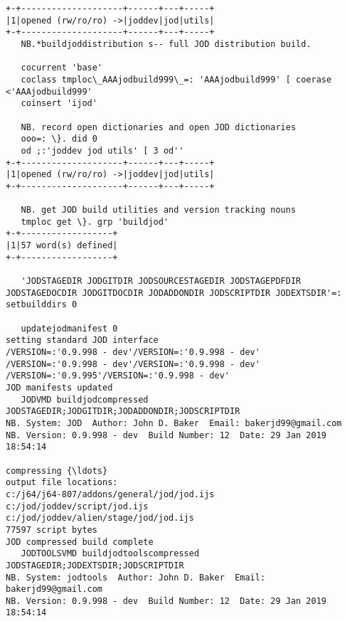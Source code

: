 \documentclass[11pt,letter,landscape]{article}
\begin{document}
    \begin{Verbatim}[commandchars=\\\{\}]
+-+--------------------+------+---+-----+
|1|opened (rw/ro/ro) ->|joddev|jod|utils|
+-+--------------------+------+---+-----+
   NB.*buildjoddistribution s-- full JOD distribution build.
   
   cocurrent 'base'
   coclass tmploc\_AAAjodbuild999\_=: 'AAAjodbuild999' [ coerase <'AAAjodbuild999'
   coinsert 'ijod'
   
   NB. record open dictionaries and open JOD dictionaries
   ooo=: \}. did 0
   od ;:'joddev jod utils' [ 3 od''
+-+--------------------+------+---+-----+
|1|opened (rw/ro/ro) ->|joddev|jod|utils|
+-+--------------------+------+---+-----+
   
   NB. get JOD build utilities and version tracking nouns
   tmploc get \}. grp 'buildjod'
+-+------------------+
|1|57 word(s) defined|
+-+------------------+
   
   'JODSTAGEDIR JODGITDIR JODSOURCESTAGEDIR JODSTAGEPDFDIR JODSTAGEDOCDIR JODGITDOCDIR JODADDONDIR JODSCRIPTDIR JODEXTSDIR'=: setbuilddirs 0
   
   updatejodmanifest 0
setting standard JOD interface
/VERSION=:'0.9.998 - dev'/VERSION=:'0.9.998 - dev'
/VERSION=:'0.9.998 - dev'/VERSION=:'0.9.998 - dev'
/VERSION=:'0.9.995'/VERSION=:'0.9.998 - dev'
JOD manifests updated
   JODVMD buildjodcompressed JODSTAGEDIR;JODGITDIR;JODADDONDIR;JODSCRIPTDIR
NB. System: JOD  Author: John D. Baker  Email: bakerjd99@gmail.com
NB. Version: 0.9.998 - dev  Build Number: 12  Date: 29 Jan 2019 18:54:14

compressing {\ldots} 
output file locations:
c:/j64/j64-807/addons/general/jod/jod.ijs
c:/jod/joddev/script/jod.ijs
c:/jod/joddev/alien/stage/jod/jod.ijs
77597 script bytes
JOD compressed build complete
   JODTOOLSVMD buildjodtoolscompressed JODSTAGEDIR;JODEXTSDIR;JODSCRIPTDIR
NB. System: jodtools  Author: John D. Baker  Email: bakerjd99@gmail.com
NB. Version: 0.9.998 - dev  Build Number: 12  Date: 29 Jan 2019 18:54:14


\end{Verbatim}
\end{document}
